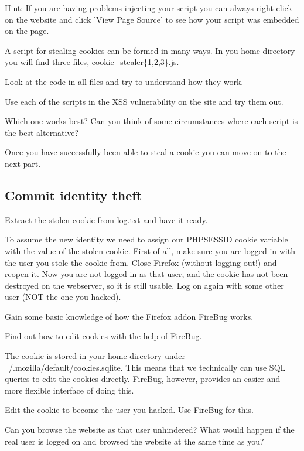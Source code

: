 \documentclass[EITN41]{../tex/cryptosecuritylab}
\begin{document}
\item Hint: If you are having problems injecting your script you can always right click on the website and click 'View Page Source' to see how your script was embedded on the page.
\eprob

A script for stealing cookies can be formed in many ways. In you home directory you will find three files, cookie\_stealer\{1,2,3\}.js. 

\bprob
\item Look at the code in all files and try to understand how they work.
\item Use each of the scripts in the XSS vulnerability on the site and try them out.
\item Which one works best? Can you think of some circumstances where each script is the best alternative?
\eprob

Once you have successfully been able to steal a cookie you can move on to the next part.

\subsection{Commit identity theft}
Extract the stolen cookie from log.txt and have it ready. 

To assume the new identity we need to assign our PHPSESSID cookie variable with the value of the stolen cookie. First of all, make sure you are logged in with the user you stole the cookie from. Close Firefox (without logging out!) and reopen it. Now you are not logged in as that user, and the cookie has not been destroyed on the webserver, so it is still usable. Log on again with some other user (NOT the one you hacked).

\bprepass
\item Gain some basic knowledge of how the Firefox addon FireBug works.
\item Find out how to edit cookies with the help of FireBug.
\eprepass

The cookie is stored in your home directory under ~/.mozilla/default/cookies.sqlite. This means that we technically can use SQL queries to edit the cookies directly. FireBug, however, provides an easier and more flexible interface of doing this.

\bprob
\item Edit the cookie to become the user you hacked. Use FireBug for this.
\item Can you browse the website as that user unhindered? What would happen if the real user is logged on and browsed the website at the same time as you? 
\eprob
\end{document}
